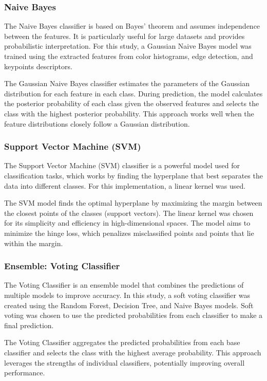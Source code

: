 \documentclass[10pt,twocolumn,letterpaper]{article}
\begin{document}
\subsubsection{Naive Bayes}

The Naive Bayes classifier is based on Bayes' theorem and assumes independence between the features. It is particularly useful for large datasets and provides probabilistic interpretation. For this study, a Gaussian Naive Bayes model was trained using the extracted features from color histograms, edge detection, and keypoints descriptors.

The Gaussian Naive Bayes classifier estimates the parameters of the Gaussian distribution for each feature in each class. During prediction, the model calculates the posterior probability of each class given the observed features and selects the class with the highest posterior probability. This approach works well when the feature distributions closely follow a Gaussian distribution.

\subsubsection{Support Vector Machine (SVM)}

The Support Vector Machine (SVM) classifier is a powerful model used for classification tasks, which works by finding the hyperplane that best separates the data into different classes. For this implementation, a linear kernel was used.

The SVM model finds the optimal hyperplane by maximizing the margin between the closest points of the classes (support vectors). The linear kernel was chosen for its simplicity and efficiency in high-dimensional spaces. The model aims to minimize the hinge loss, which penalizes misclassified points and points that lie within the margin.

\subsubsection{Ensemble: Voting Classifier}

The Voting Classifier is an ensemble model that combines the predictions of multiple models to improve accuracy. In this study, a soft voting classifier was created using the Random Forest, Decision Tree, and Naive Bayes models. Soft voting was chosen to use the predicted probabilities from each classifier to make a final prediction.

The Voting Classifier aggregates the predicted probabilities from each base classifier and selects the class with the highest average probability. This approach leverages the strengths of individual classifiers, potentially improving overall performance.
\end{document}
